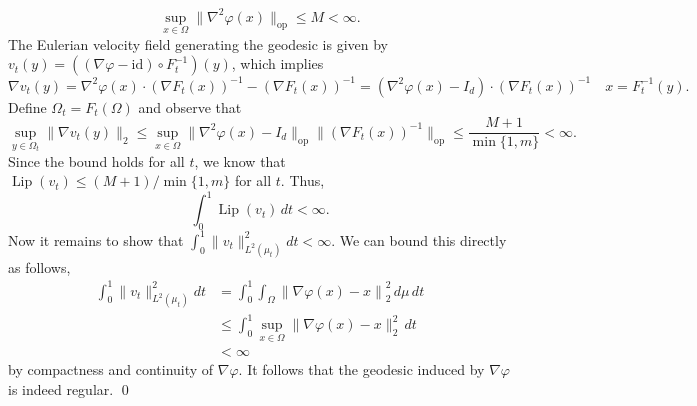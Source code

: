 \documentclass[11pt]{article}
\begin{document}
\[\sup_{x \in \Omega} \|\nabla^2\varphi(x)\|_{\text{op}} \leq M < \infty.\]
The Eulerian velocity field generating the geodesic is given by $v_t(y) = ((\nabla\varphi - \text{id}) \circ F^{-1}_t)(y)$, which implies \[\nabla v_t(y) = \nabla^2 \varphi(x)\cdot (\nabla F_t(x))^{-1} - (\nabla F_t(x))^{-1} = (\nabla^2 \varphi(x) - I_d)\cdot (\nabla F_t(x))^{-1}\quad x = F_t^{-1}(y).\] Define $\Omega_t = F_t(\Omega)$ and observe that
\[\sup_{y \in \Omega_t}\|\nabla v_t(y)\|_2 \leq \sup_{x\in \Omega}\|\nabla^2\varphi(x) - I_d\|_{\text{op}}\|(\nabla F_t(x))^{-1}\|_{\text{op}} \leq \frac{M+1}{\min\{1, m\}} < \infty.\]
Since the bound holds for all $t$, we know that ${\operatorname{Lip}}(v_t) \leq (M+1)/\min\{1,m\}$ for all $t$. Thus,
\[\int_0^1 {\operatorname{Lip}}(v_t) \, dt < \infty.\]
Now it remains to show that $\int_0^1\|v_t\|_{L^2(\mu_t)}^2 dt < \infty.$ We can bound this directly as follows,
\begin{align*}
    \int_0^1 \|v_t\|_{L^2(\mu_t)}^2 dt &= \int_0^1\int_\Omega\left\|\nabla\varphi(x) - x\right\|_2^2 \, d\mu \, dt \tag{$\mu_t = (F_t)_\#\mu$} \\
    &\leq \int_0^1 \sup_{x \in \Omega}\|\nabla \varphi(x) - x\|_2^2 \, dt \\
    & < \infty
\end{align*}
by compactness and continuity of $\nabla \varphi$. It follows that the geodesic induced by $\nabla \varphi$ is indeed regular.
\qed{}
\end{document}
